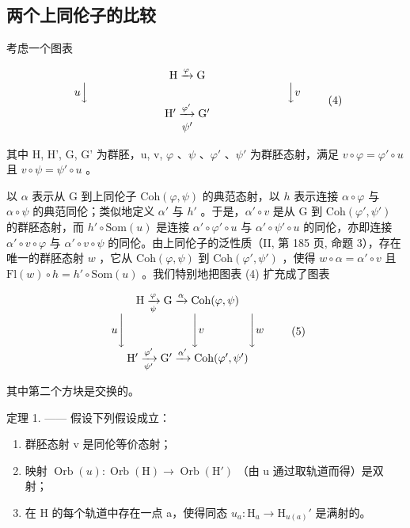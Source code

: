 \subsection{两个上同伦子的比较}

考虑一个图表

\[
\begin{array}{c} \mathrm{H} \xrightarrow {\varphi} \mathrm{G} \\ u \Big \downarrow \qquad \qquad \qquad \qquad \qquad \qquad \qquad \qquad \qquad \Big \downarrow v \\ \mathrm{H} ^ {\prime} \xrightarrow {\varphi^ {\prime}} \mathrm{G} ^ {\prime} \\ \psi^ {\prime} \end{array}\tag{4}
\]

其中 H, H', G, G' 为群胚，u, v, \(\varphi\) 、\(\psi\) 、\(\varphi'\) 、\(\psi'\) 为群胚态射，满足 \(v \circ \varphi = \varphi' \circ u\) 且 \(v \circ \psi = \psi' \circ u\) 。

以 \(\alpha\) 表示从 G 到上同伦子 \(\mathrm{Coh}(\varphi, \psi)\) 的典范态射，以 \(h\) 表示连接 \(\alpha \circ \varphi\) 与 \(\alpha \circ \psi\) 的典范同伦；类似地定义 \(\alpha'\) 与 \(h'\) 。于是，\(\alpha' \circ v\) 是从 G 到 \(\mathrm{Coh}(\varphi', \psi')\) 的群胚态射，而 \(h' \circ \mathrm{Som}(u)\) 是连接 \(\alpha' \circ \varphi' \circ u\) 与 \(\alpha' \circ \psi' \circ u\) 的同伦，亦即连接 \(\alpha' \circ v \circ \varphi\) 与 \(\alpha' \circ v \circ \psi\) 的同伦。由上同伦子的泛性质（II, 第 185 页, 命题 3），存在唯一的群胚态射 \(w\) ，它从 \(\mathrm{Coh}(\varphi, \psi)\) 到 \(\mathrm{Coh}(\varphi', \psi')\) ，使得 \(w \circ \alpha = \alpha' \circ v\) 且 \(\mathrm{Fl}(w) \circ h = h' \circ \mathrm{Som}(u)\) 。我们特别地把图表 (4) 扩充成了图表

\[
\begin{array}{c} \mathrm{H} \xrightarrow [ \psi ]{\varphi} \mathrm{G} \xrightarrow {\alpha} \mathrm{Coh} (\varphi , \psi) \\ u \Biggl \downarrow \qquad \qquad \qquad \Biggl \downarrow v \qquad \qquad \Biggl \downarrow w \\ \mathrm{H} ^ {\prime} \xrightarrow [ \psi^ {\prime} ]{\varphi^ {\prime}} \mathrm{G} ^ {\prime} \xrightarrow {\alpha^ {\prime}} \mathrm{Coh} (\varphi^ {\prime}, \psi^ {\prime}) \end{array}\tag{5}
\]

其中第二个方块是交换的。

定理 1. —— 假设下列假设成立：

\begin{enumerate}
\def\labelenumi{(\roman{enumi})}
\item
  群胚态射 v 是同伦等价态射；
\item
  映射 \(\operatorname{Orb}(u)\colon\operatorname{Orb}(\mathrm{H})\to\operatorname{Orb}(\mathrm{H}')\) （由 u 通过取轨道而得）是双射；
\item
  在 H 的每个轨道中存在一点 a，使得同态 \(u_a \colon \mathrm{H}_a \to \mathrm{H}_{u(a)}'\) 是满射的。
\end{enumerate}

